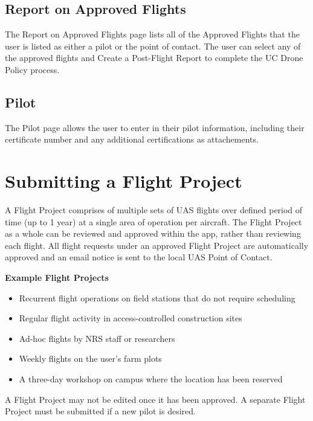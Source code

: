 \documentclass[
]{book}
\providecommand{\tightlist}{%
  \setlength{\itemsep}{0pt}\setlength{\parskip}{0pt}}
\begin{document}
\hypertarget{report-on-approved-flights}{%
\section{Report on Approved Flights}\label{report-on-approved-flights}}

The Report on Approved Flights page lists all of the Approved Flights that the user is listed as either a pilot or the point of contact. The user can select any of the approved flights and Create a Post-Flight Report to complete the UC Drone Policy process.

\hypertarget{pilot}{%
\section{Pilot}\label{pilot}}

The Pilot page allows the user to enter in their pilot information, including their certificate number and any additional certifications as attachements.

\hypertarget{ch-UCDrones-project}{%
\chapter{Submitting a Flight Project}\label{ch-UCDrones-project}}

A Flight Project comprises of multiple sets of UAS flights over defined period of time (up to 1 year) at a single area of operation per aircraft. The Flight Project as a whole can be reviewed and approved within the app, rather than reviewing each flight. All flight requests under an approved Flight Project are automatically approved and an email notice is sent to the local UAS Point of Contact.

\textbf{Example Flight Projects}

\begin{itemize}
\tightlist
\item
  Recurrent flight operations on field stations that do not require scheduling
\item
  Regular flight activity in access-controlled construction sites
\item
  Ad-hoc flights by NRS staff or researchers
\item
  Weekly flights on the user's farm plots
\item
  A three-day workshop on campus where the location has been reserved
\end{itemize}

A Flight Project may not be edited once it has been approved. A separate Flight Project must be submitted if a new pilot is desired.
\end{document}
